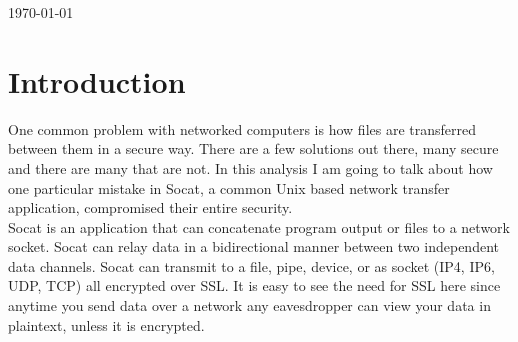\documentclass[letterpaper,11pt,notitlepage,fleqn]{article}
\begin{document}
\begin{titlepage}

{\large \today}\\[3cm] %




\vfill %



\end{titlepage}

\tableofcontents
\newpage

\section{Introduction}
\indent One common problem with networked computers is how files are transferred between them in a secure way. There are a few solutions out there, many secure and there are many that are not. In this analysis I am going to talk about how one particular mistake in Socat, a common Unix based network transfer application, compromised their entire security.
\\
\indent Socat is an application that can concatenate program output or files to a network socket. Socat can relay data in a bidirectional manner between two independent data channels. Socat can transmit to a file, pipe, device, or as socket (IP4, IP6, UDP, TCP) all encrypted over SSL. It is easy to see the need for SSL here since anytime you send data over a network any eavesdropper can view your data in plaintext, unless it is encrypted. 
\\
\\
\end{document}
